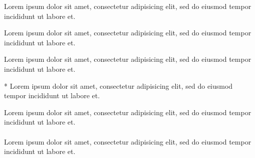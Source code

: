 \documentclass{article}
\begin{document}

\clozereset

\begin{clozebox}[boxwidth=5cm]
Lorem ipsum dolor sit amet, consectetur adipisicing elit, sed do eiusmod
tempor incididunt ut labore et.
\end{clozebox}


\clozereset

\begin{clozebox}[boxwidth=5cm,boxheight=5cm]
Lorem ipsum dolor sit amet, consectetur adipisicing elit, sed do eiusmod
tempor incididunt ut labore et.
\end{clozebox}


\clozereset

\begin{clozebox}[box_rule=0.2cm,hide]
Lorem ipsum dolor sit amet, consectetur adipisicing elit, sed do eiusmod
tempor incididunt ut labore et.
\end{clozebox}


\begin{clozebox}*
Lorem ipsum dolor sit amet, consectetur adipisicing elit, sed do eiusmod
tempor incididunt ut labore et.
\end{clozebox}


\begin{clozebox}
\noindent
Lorem ipsum dolor sit amet, consectetur adipisicing elit, sed do eiusmod
tempor incididunt ut labore et.\\\\
%
Lorem ipsum dolor sit amet, consectetur adipisicing elit, sed do eiusmod
tempor incididunt ut labore et.
\end{clozebox}
\end{document}
